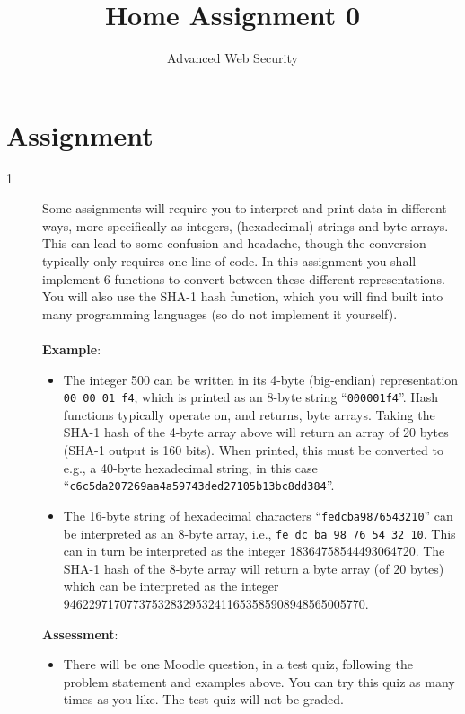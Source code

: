 \documentclass{article}
\begin{document}
\title{Home Assignment 0}
\author{Advanced Web Security}
\date{\the\year}

\maketitle

\section*{Assignment}

\begin{description}
	\item[1~~~]{Some assignments will require you to interpret and print data in different ways, more specifically as integers, 
		(hexadecimal) strings and byte arrays. This can lead to some confusion and headache, though the conversion typically only requires one line of code. 
		In this assignment you shall implement 6 functions to convert between these different representations. 
		You will also use the SHA-1 hash function, which you will find built into many programming languages (so do not implement it yourself).\\\\
    \textbf{Example}:
    
	\begin{itemize}
		\item The integer 500 can be written in its 4-byte (big-endian) representation \texttt{00 00 01 f4}, 
			which is printed as an 8-byte string ``\texttt{000001f4}''. Hash functions typically operate on, and returns, byte arrays. 
			Taking the SHA-1 hash of the 4-byte array above will return an array of 20 bytes (SHA-1 output is 160 bits). 
			When printed, this must be converted to e.g., a 40-byte hexadecimal string, in this case ``\texttt{c6c5da207269aa4a59743ded27105b13bc8dd384}''.

		\item The 16-byte string of hexadecimal characters ``\texttt{fedcba9876543210}'' can be interpreted as an 8-byte array, 
			i.e., \texttt{fe dc ba 98 76 54 32 10}. This can in turn be interpreted as the integer 18364758544493064720. 
			The SHA-1 hash of the 8-byte array will return a byte array (of 20 bytes) which can be interpreted as the integer 946229717077375328329532411653585908948565005770.
    \end{itemize}
	
	\textbf{Assessment}:
	\begin{itemize}
		\item There will be one Moodle question, in a test quiz, following the problem statement and examples above. You can try this quiz as many times as you like. The test quiz will not be graded.
	\end{itemize}
	}
\end{description}
\end{document}
